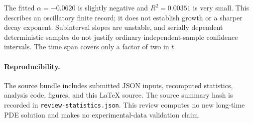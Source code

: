 \documentclass[10pt]{article}
\begin{document}
The fitted $\alpha=-0.0620$ is slightly negative and $R^2=0.00351$ is very small. This describes an oscillatory finite record; it does not establish growth or a sharper decay exponent. Subinterval slopes are unstable, and serially dependent deterministic samples do not justify ordinary independent-sample confidence intervals. The time span covers only a factor of two in $t$.
\paragraph{Reproducibility.} The source bundle includes submitted JSON inputs, recomputed statistics, analysis code, figures, and this LaTeX source. The source summary hash is recorded in \texttt{review-statistics.json}. This review computes no new long-time PDE solution and makes no experimental-data validation claim.

\end{document}
